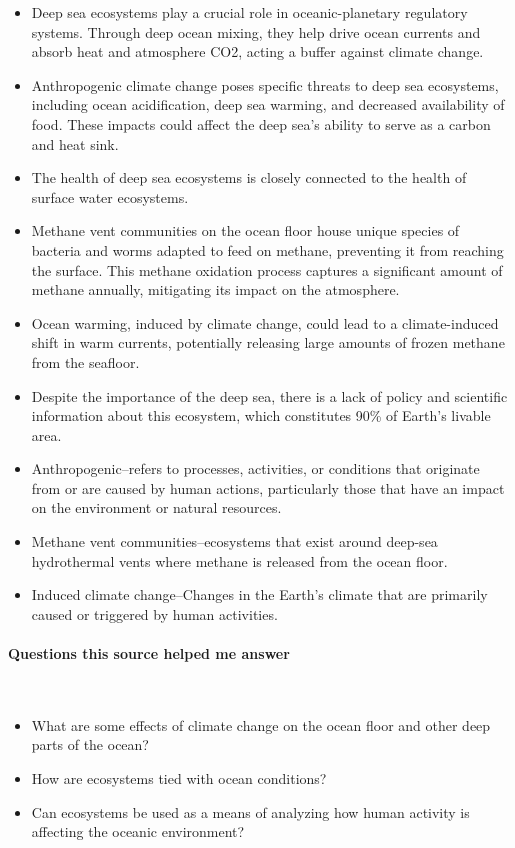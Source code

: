 \begin{itemize}
    \item Deep sea ecosystems play a crucial role in oceanic-planetary regulatory systems. Through deep ocean mixing, they help drive ocean currents and absorb heat and atmosphere CO2, acting a buffer against climate change. 
    \item Anthropogenic climate change poses specific threats to deep sea ecosystems, including ocean acidification, deep sea warming, and decreased availability of food. These impacts could affect the deep sea's ability to serve as a carbon and heat sink. 
    \item The health of deep sea ecosystems is closely connected to the health of surface water ecosystems. 
    \item Methane vent communities on the ocean floor house unique species of bacteria and worms adapted to feed on methane, preventing it from reaching the surface. This methane oxidation process captures a significant amount of methane annually, mitigating its impact on the atmosphere. 
    \item Ocean warming, induced by climate change, could lead to a climate-induced shift in warm currents, potentially releasing large amounts of frozen methane from the seafloor. 
    \item Despite the importance of the deep sea, there is a lack of policy and scientific information about this ecosystem, which constitutes 90\% of Earth's livable area.
    \item Anthropogenic--refers to processes, activities, or conditions that originate from or are caused by human actions, particularly those that have an impact on the environment or natural resources. 
    \item Methane vent communities--ecosystems that exist around deep-sea hydrothermal vents where methane is released from the ocean floor. 
    \item Induced climate change--Changes in the Earth's climate that are primarily caused or triggered by human activities.     
\end{itemize}
    
\vspace*{-0.5cm}
\paragraph{Questions this source helped me answer} \

\begin{itemize}
    \item What are some effects of climate change on the ocean floor and other deep parts of the ocean?
    \item How are ecosystems tied with ocean conditions?
    \item Can ecosystems be used as a means of analyzing how human activity is affecting the oceanic environment?  
\end{itemize}

